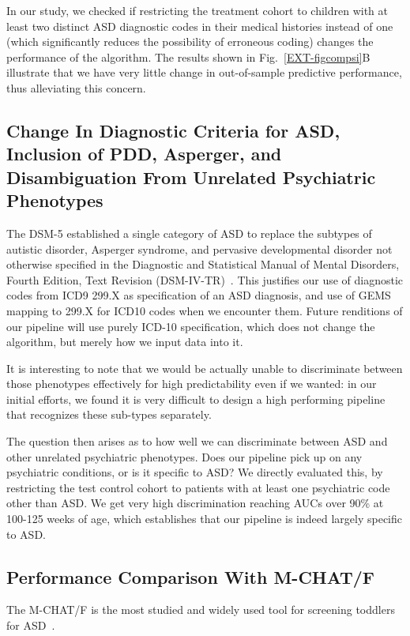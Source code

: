 \documentclass[3p,super,numbers,sort&compress,preprint,10pt]{elsarticle}
\begin{document}
In our study, we checked if restricting the treatment cohort to children with at least two  distinct ASD diagnostic codes in their medical histories instead of one (which significantly reduces the possibility of erroneous coding) changes the performance of the algorithm. The results  shown in Fig.~\ref{EXT-figcompsi}B illustrate that we have very little change in out-of-sample predictive performance, thus alleviating this concern.

\subsection{Change In Diagnostic Criteria for ASD, Inclusion of PDD, Asperger, and Disambiguation From Unrelated Psychiatric Phenotypes}\label{subsec:otherpsych}

The DSM-5 established
a single category of ASD to replace
the subtypes of autistic disorder,
Asperger syndrome, and pervasive
developmental disorder not
otherwise specified in the Diagnostic
and Statistical Manual of Mental
Disorders, Fourth Edition, Text
Revision (DSM-IV-TR)~\cite{hyman2020identification}. This justifies our use of diagnostic codes from ICD9 299.X as specification of an ASD diagnosis, and use of GEMS mapping to 299.X for ICD10 codes when we encounter them. Future renditions of our pipeline will use purely ICD-10 specification, which does not change the algorithm, but merely how we input data into it.

 It is  interesting to note that we would be actually unable to discriminate between  those phenotypes effectively for  high predictability even if we wanted: in our initial efforts, we found it is very difficult to design a high performing pipeline that recognizes these sub-types separately.

The  question then arises as to how well we can discriminate between ASD and other unrelated psychiatric phenotypes. Does our pipeline pick up on any psychiatric conditions, or is it specific to ASD? We directly evaluated this, by restricting the test control  cohort to  patients with at least one psychiatric code other than ASD. We get very high discrimination reaching AUCs over 90\% at 100-125 weeks of age, which establishes that our pipeline is indeed largely specific to ASD.
%
\subsection{Performance Comparison With M-CHAT/F}
 The M-CHAT/F is the
most studied and widely used tool
for screening toddlers for ASD~\cite{robins2014validation,hyman2020identification}.
\end{document}
